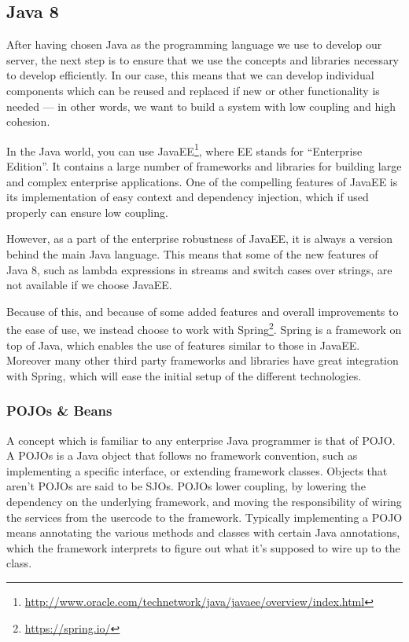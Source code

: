 \subsection{Java 8}
After having chosen Java as the programming language we use to develop our server, the next step is to ensure that we use the concepts and libraries necessary to develop efficiently.
In our case, this means that we can develop individual components which can be reused and replaced if new or other functionality is needed --- in other words, we want to build a system with low coupling and high cohesion.

In the Java world, you can use JavaEE\footnote{\url{http://www.oracle.com/technetwork/java/javaee/overview/index.html}}, where EE stands for ``Enterprise Edition''.
It contains a large number of frameworks and libraries for building large and complex enterprise applications.
One of the compelling features of JavaEE is its implementation of easy context and dependency injection, which if used properly can ensure low coupling.

However, as a part of the enterprise robustness of JavaEE, it is always a version behind the main Java language.
This means that some of the new features of Java 8, such as lambda expressions in streams and switch cases over strings, are not available if we choose JavaEE.

Because of this, and because of some added features and overall improvements to the ease of use, we instead choose to work with Spring\footnote{\url{https://spring.io/}}.
Spring is a framework on top of Java, which enables the use of features similar to those in JavaEE.
Moreover many other third party frameworks and libraries have great integration with Spring, which will ease the initial setup of the different technologies.

\subsubsection{POJOs \& Beans}
A concept which is familiar to any enterprise Java programmer is that of \ac{POJO}.
A \acp{POJO} is a Java object that follows no framework convention, such as implementing a specific interface, or extending framework classes.
Objects that aren't \acp{POJO} are said to be \acp{SJO}.
\acp{POJO} lower coupling, by lowering the dependency on the underlying framework, and moving the responsibility of wiring the services from the usercode to the framework.
Typically implementing a \ac{POJO} means annotating the various methods and classes with certain Java annotations, which the framework interprets to figure out what it's supposed to wire up to the class. \cite{spring_pojo}


